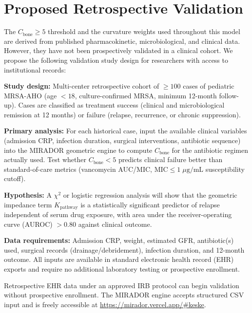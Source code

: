 \documentclass[11pt]{article}
\begin{document}
\section{Proposed Retrospective Validation}

The $C_{\text{bone}} \geq 5$ threshold and the curvature weights used throughout
this model are derived from published pharmacokinetic, microbiological, and
clinical data. However, they have not been prospectively validated in a
clinical cohort. We propose the following validation study design for
researchers with access to institutional records:

\textbf{Study design:} Multi-center retrospective cohort of $\geq 100$ cases of
pediatric MRSA-AHO (age $< 18$, culture-confirmed MRSA, minimum 12-month
follow-up). Cases are classified as treatment success (clinical and microbiological
remission at 12 months) or failure (relapse, recurrence, or chronic suppression).

\textbf{Primary analysis:} For each historical case, input the available clinical
variables (admission CRP, infection duration, surgical interventions, antibiotic
sequence) into the MIRADOR geometric engine to compute $C_{\text{bone}}$ for
the antibiotic regimen actually used. Test whether $C_{\text{bone}} < 5$ predicts
clinical failure better than standard-of-care metrics (vancomycin AUC/MIC,
$\text{MIC} \leq 1\;\mu\text{g/mL}$ susceptibility cutoff).

\textbf{Hypothesis:} A $\chi^2$ or logistic regression analysis will show that
the geometric impedance term $K_{\text{pathway}}$ is a statistically significant
predictor of relapse independent of serum drug exposure, with area under the
receiver-operating curve (AUROC) $> 0.80$ against clinical outcome.

\textbf{Data requirements:} Admission CRP, weight, estimated GFR, antibiotic(s)
used, surgical records (drainage/debridement), infection duration, and 12-month
outcome. All inputs are available in standard electronic health record (EHR)
exports and require no additional laboratory testing or prospective enrollment.

Retrospective EHR data under an approved IRB protocol can begin validation
without prospective enrollment. The MIRADOR engine accepts structured CSV input
and is freely accessible at \url{https://mirador.vercel.app/\#keske}.

\end{document}
